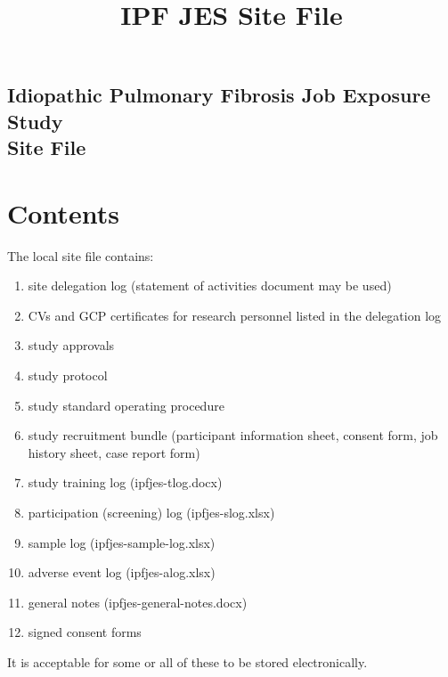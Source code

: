\documentclass[a4paper,10pt]{article}
\begin{document}
 \newpage\title{\bf IPF JES Site File}
 \date{}
 
 
 \pagestyle{fancy}
 
 
 \begin{centering} 
 \section*{Idiopathic Pulmonary Fibrosis Job Exposure Study \\ Site File}
 \end{centering}

 \section*{Contents}

 The local site file contains:

 \begin{enumerate}
     \item site delegation log (statement of activities document may be used)
     \item CVs and GCP certificates for research personnel listed in the delegation log
     \item study approvals
     \item study protocol 
     \item study standard operating procedure 
     \item study recruitment bundle (participant information sheet, consent form, job history sheet, case report form)
     \item study training log (ipfjes-tlog.docx)
     \item participation (screening) log (ipfjes-slog.xlsx)
     \item sample log (ipfjes-sample-log.xlsx)
     \item adverse event log (ipfjes-alog.xlsx)
     \item general notes (ipfjes-general-notes.docx)
     \item signed consent forms
 \end{enumerate}

It is acceptable for some or all of these to be stored electronically. 
\end{document}
